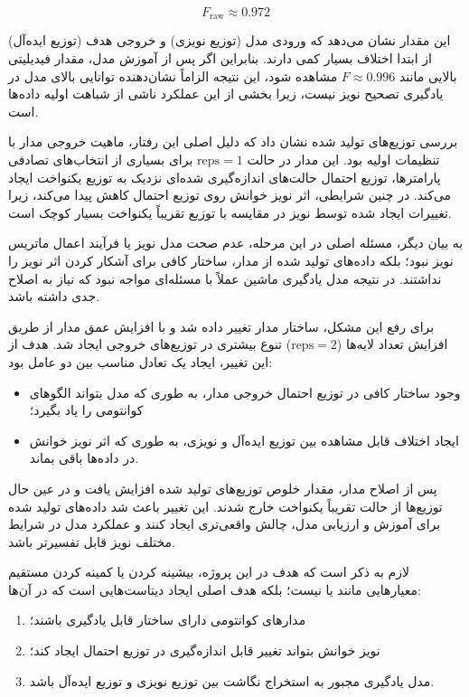 \begin{equation}
	F_{\mathrm{raw}} \approx 0.972
\end{equation}

این مقدار نشان می‌دهد که ورودی مدل (توزیع نویزی) و خروجی هدف (توزیع ایده‌آل) از ابتدا اختلاف بسیار کمی دارند. بنابراین اگر پس از آموزش مدل، مقدار فیدیلیتی بالایی مانند
$F \approx 0.996$
مشاهده شود، این نتیجه الزاماً نشان‌دهنده توانایی بالای مدل در یادگیری تصحیح نویز نیست، زیرا بخشی از این عملکرد ناشی از شباهت اولیه داده‌ها است.

بررسی توزیع‌های تولید شده نشان داد که دلیل اصلی این رفتار، ماهیت خروجی مدار
با تنظیمات اولیه بود. این مدار در حالت
$\mathrm{reps}=1$
برای بسیاری از انتخاب‌های تصادفی پارامترها، توزیع احتمال حالت‌های اندازه‌گیری شده‌ای نزدیک به توزیع یکنواخت ایجاد می‌کند. در چنین شرایطی، اثر نویز خوانش روی توزیع احتمال کاهش پیدا می‌کند، زیرا تغییرات ایجاد شده توسط نویز در مقایسه با توزیع تقریباً یکنواخت بسیار کوچک است.

به بیان دیگر، مسئله اصلی در این مرحله، عدم صحت مدل نویز یا فرآیند اعمال ماتریس نویز نبود؛ بلکه داده‌های تولید شده از مدار، ساختار کافی برای آشکار کردن اثر نویز را نداشتند. در نتیجه مدل یادگیری ماشین عملاً با مسئله‌ای مواجه نبود که نیاز به اصلاح جدی داشته باشد.

برای رفع این مشکل، ساختار مدار تغییر داده شد و با افزایش عمق مدار از طریق افزایش تعداد لایه‌ها
($\mathrm{reps}=2$)
تنوع بیشتری در توزیع‌های خروجی ایجاد شد. هدف از این تغییر، ایجاد یک تعادل مناسب بین دو عامل بود:

\begin{itemize}
	\item وجود ساختار کافی در توزیع احتمال خروجی مدار، به طوری که مدل بتواند الگوهای کوانتومی را یاد بگیرد؛
	\item ایجاد اختلاف قابل مشاهده بین توزیع ایده‌آل و نویزی، به طوری که اثر نویز خوانش در داده‌ها باقی بماند.
\end{itemize}

پس از اصلاح مدار، مقدار خلوص توزیع‌های تولید شده افزایش یافت و در عین حال توزیع‌ها از حالت تقریباً یکنواخت خارج شدند. این تغییر باعث شد داده‌های تولید شده برای آموزش و ارزیابی مدل، چالش واقعی‌تری ایجاد کنند و عملکرد مدل در شرایط مختلف نویز قابل تفسیرتر باشد.

لازم به ذکر است که هدف در این پروژه، بیشینه کردن یا کمینه کردن مستقیم معیارهایی مانند
یا
نیست؛ بلکه هدف اصلی ایجاد دیتاست‌هایی است که در آن‌ها:
\begin{enumerate}
	\item مدارهای کوانتومی دارای ساختار قابل یادگیری باشند؛
	\item نویز خوانش بتواند تغییر قابل اندازه‌گیری در توزیع احتمال ایجاد کند؛
	\item مدل یادگیری مجبور به استخراج نگاشت بین توزیع نویزی و توزیع ایده‌آل باشد.
\end{enumerate}

